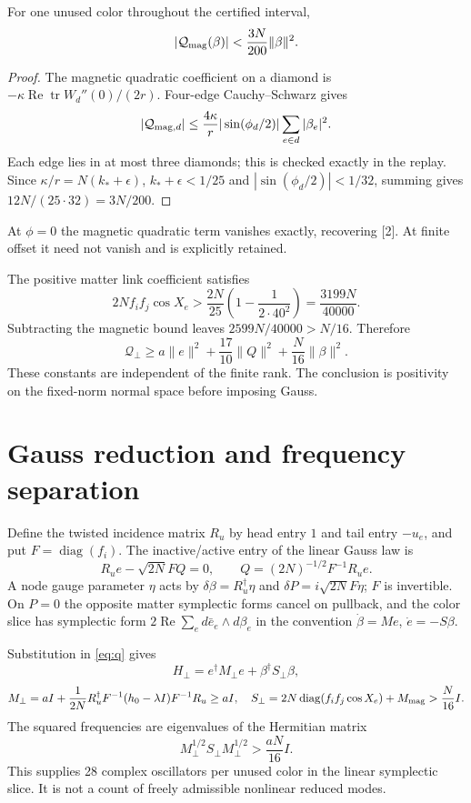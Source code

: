 \documentclass[11pt,a4paper]{article}
\newcommand{\tr}{\operatorname{tr}}\newcommand{\diag}{\operatorname{diag}}\newcommand{\Rea}{\operatorname{Re}}\newcommand{\id}{\mathbf1}
\begin{document}
\begin{lemma}
For one unused color throughout the certified interval,
\[
|\mathcal Q_{\rm mag}(\beta)|<\frac{3N}{200}\|\beta\|^2.
\]
\end{lemma}
\begin{proof}
The magnetic quadratic coefficient on a diamond is $-\kappa\Rea\tr W_d''(0)/(2r)$. Four-edge Cauchy--Schwarz gives
\[
|\mathcal Q_{{\rm mag},d}|\le\frac{4\kappa}{r}|\sin(\phi_d/2)|
\sum_{e\in d}|\beta_e|^2.
\]
Each edge lies in at most three diamonds; this is checked exactly in the replay. Since $\kappa/r=N(k_*+\epsilon)$, $k_*+\epsilon<1/25$ and $|\sin(\phi_d/2)|<1/32$, summing gives $12N/(25\cdot32)=3N/200$.
\end{proof}
At $\phi=0$ the magnetic quadratic term vanishes exactly, recovering [2]. At finite offset it need not vanish and is explicitly retained.

The positive matter link coefficient satisfies
\[
2Nf_if_j\cos X_e>\frac{2N}{25}\left(1-\frac{1}{2\cdot40^2}\right)
=\frac{3199N}{40000}.
\]
Subtracting the magnetic bound leaves $2599N/40000>N/16$. Therefore
\begin{equation}\label{eq:coercive}
\boxed{\mathcal Q_\perp\ge a\|e\|^2+\frac{17}{10}\|Q\|^2+
\frac N{16}\|\beta\|^2.}
\end{equation}
These constants are independent of the finite rank. The conclusion is positivity on the fixed-norm normal space before imposing Gauss.
\newpage
\section{Gauss reduction and frequency separation}
Define the twisted incidence matrix $R_u$ by head entry $1$ and tail entry $-u_e$, and put $F=\diag(f_i)$. The inactive/active entry of the linear Gauss law is
\[
R_u e-\sqrt{2N}FQ=0,
\qquad Q=(2N)^{-1/2}F^{-1}R_u e.
\]
A node gauge parameter $\eta$ acts by $\delta\beta=R_u^\dagger\eta$ and $\delta P=i\sqrt{2N}F\eta$; $F$ is invertible. On $P=0$ the opposite matter symplectic forms cancel on pullback, and the color slice has symplectic form $2\Rea\sum_e d\bar e_e\wedge d\beta_e$ in the convention $\dot\beta=Me$, $\dot e=-S\beta$.

Substitution in \eqref{eq:q} gives
\[
H_\perp=e^\dagger M_\perp e+\beta^\dagger S_\perp\beta,
\]
\[
M_\perp=aI+\frac1{2N}R_u^\dagger F^{-1}(h_0-\lambda I)F^{-1}R_u\ge aI,
\quad S_\perp=2N\diag(f_if_j\cos X_e)+M_{\rm mag}>\frac N{16}I.
\]
The squared frequencies are eigenvalues of the Hermitian matrix
\[
M_\perp^{1/2}S_\perp M_\perp^{1/2}>\frac{aN}{16}I.
\]
This supplies 28 complex oscillators per unused color in the linear symplectic slice. It is not a count of freely admissible nonlinear reduced modes.
\end{document}
